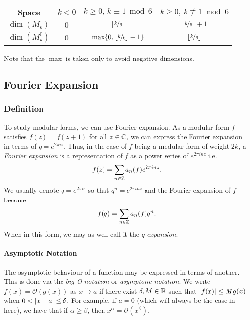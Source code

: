 \begin{center}
\begin{tabular}{||c||c|c|c||} 
    \hline
    Space & $k<0$ & $k \geq 0, \ k \equiv 1 \bmod 6$ & $k \geq 0, \ k \not \equiv 1 \bmod 6$ \\
    \hline
    \hline
    $\dim(M_k)$ & $0$ & $\lfloor \nicefrac{k}{6} \rfloor$ & $\lfloor \nicefrac{k}{6} \rfloor + 1$ \\
    \hline
    $\dim(M_k^0)$ & $0$ & $\max\{0, \lfloor \nicefrac{k}{6} \rfloor - 1\}$ & $\lfloor \nicefrac{k}{6} \rfloor$ \\
    \hline
\end{tabular}
\end{center}
Note that the $\max$ is taken only to avoid negative dimensions.



\subsection{Fourier Expansion}
\subsubsection{Definition}
To study modular forms, we can use Fourier expansion.
As a modular form $f$ satisfies $f(z) = f(z+1)$ for all $z \in \mathbb{C}$, we can express the Fourier expansion in terms of $q = e^{2 \pi i z}$.
Thus, in the case of $f$ being a modular form of weight $2k$, 
a \textit{Fourier expansion} is a representation of $f$ as a power series of $e^{2\pi i n z}$
i.e. $$f(z) = \sum_{n \in \mathbb{Z}} a_n(f) e^{2\pi inz}.$$
We usually denote $q = e^{2\pi i z}$ so that $q^n = e^{2\pi i n z}$ 
and the Fourier expansion of $f$ become 
$$
f(q) = \sum_{n \in \mathbb{Z}} a_n(f) q^n.
$$
When in this form, we may as well call it the \textit{$q$-expansion}.

\paragraph{Asymptotic Notation}
The asymptotic behaviour of a function may be expressed in terms of another.
This is done via the \textit{big-O notation} or \textit{asymptotic notation}.
We write $f(x) = \mathcal{O}(g(x))$ as $x \to a$ if there exist $\delta, M \in \mathbb{R}$ such that $| f(x) | \leq Mg(x)$ when $0 < | x-a | \leq \delta$.
For example, if $a=0$ (which will always be the case in here), we have that if $\alpha \geq \beta$, then $x^{\alpha} = \mathcal{O}(x^{\beta})$.

